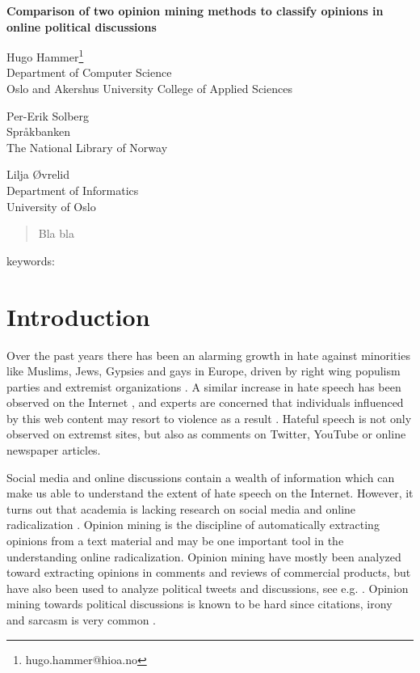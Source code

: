 \documentclass[a4paper, 12pt]{article}
\begin{document}
\begin{center}
  \textbf{\Large{Comparison of two opinion mining methods to classify opinions in online political discussions}}

\vspace{5mm}

\large{Hugo Hammer\footnote{hugo.hammer@hioa.no} \\
\vspace{1mm}
Department of Computer Science\\
Oslo and Akershus University College of Applied Sciences}

\vspace{5mm}

\large{Per-Erik Solberg \\
\vspace{1mm}
Spr\aa kbanken\\
The National Library of Norway}

\vspace{5mm}

\large{ Lilja \O vrelid\\
\vspace{1mm}
Department of Informatics\\
University of Oslo}

\end{center}

\begin{abstract}
Bla bla
\end{abstract}

keywords: \textit{}

\section{Introduction}
\label{sec:introduction}

Over the past years there has been an alarming growth in hate against minorities like Muslims, Jews, Gypsies and gays in Europe, driven by right wing populism parties and extremist organizations \citep{r4, r11}. A similar increase in hate speech has been observed on the Internet \citep{r6, s2}, and experts are concerned that individuals influenced by this web content may resort to violence as a result \citep{Strommen12, Sunde13}. Hateful speech is not only observed on extremst sites, but also as comments on Twitter, YouTube or online newspaper articles.  

Social media and online discussions contain a wealth of information which can make us able to understand the extent of hate speech on the Internet. However, it turns out that academia is lacking research on social media and online radicalization \citep{s1}. Opinion mining is the discipline of automatically extracting opinions from a text material and may be one important tool in the understanding online radicalization. Opinion mining have mostly been analyzed toward extracting opinions in comments and reviews of commercial products, but have also been used to analyze political tweets and discussions, see e.g.  \citet{Tumasjan2010, Chen10}. Opinion mining towards political discussions is known to be hard since citations, irony and sarcasm is very common \citep{Bing12}.
\end{document}
